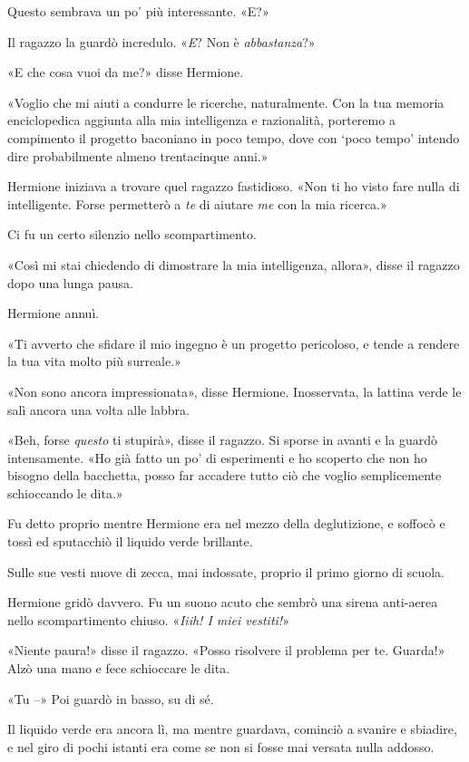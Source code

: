 Questo sembrava un po’ più interessante. «E?»

Il ragazzo la guardò incredulo. «\textit{E}? Non è \textit{abbastanza}?»

«E che cosa vuoi da me?» disse Hermione.

«Voglio che mi aiuti a condurre le ricerche, naturalmente. Con la tua memoria enciclopedica aggiunta alla mia intelligenza e razionalità, porteremo a compimento il progetto baconiano in poco tempo, dove con ‘poco tempo’ intendo dire probabilmente almeno trentacinque anni.»

Hermione iniziava a trovare quel ragazzo fastidioso. «Non ti ho visto fare nulla di intelligente. Forse permetterò a \textit{te} di aiutare \textit{me} con la mia ricerca.»

Ci fu un certo silenzio nello scompartimento.

«Così mi stai chiedendo di dimostrare la mia intelligenza, allora», disse il ragazzo dopo una lunga pausa.

Hermione annuì.

«Ti avverto che sfidare il mio ingegno è un progetto pericoloso, e tende a rendere la tua vita molto più surreale.»

«Non sono ancora impressionata», disse Hermione. Inosservata, la lattina verde le salì ancora una volta alle labbra.

«Beh, forse \textit{questo} ti stupirà», disse il ragazzo. Si sporse in avanti e la guardò intensamente. «Ho già fatto un po’ di esperimenti e ho scoperto che non ho bisogno della bacchetta, posso far accadere tutto ciò che voglio semplicemente schioccando le dita.»

Fu detto proprio mentre Hermione era nel mezzo della deglutizione, e soffocò e tossì ed sputacchiò il liquido verde brillante.

Sulle sue vesti nuove di zecca, mai indossate, proprio il primo giorno di scuola.

Hermione gridò davvero. Fu un suono acuto che sembrò una sirena anti-aerea nello scompartimento chiuso. «\textit{Iiih! I miei vestiti!}»

«Niente paura!» disse il ragazzo. «Posso risolvere il problema per te. Guarda!» Alzò una mano e fece schioccare le dita.

«Tu –» Poi guardò in basso, su di sé.

Il liquido verde era ancora lì, ma mentre guardava, cominciò a svanire e sbiadire, e nel giro di pochi istanti era come se non si fosse mai versata nulla addosso.

